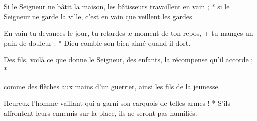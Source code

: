 \item Si le Seigneur ne bâtit la maison, les bâtisseurs travaillent en vain ; * si le Seigneur ne garde la ville, c'est en vain que veillent les gardes.

\item En vain tu devances le jour, tu retardes le moment de ton repos, + tu manges un pain de douleur : * Dieu comble son bien-aimé quand il dort.

\item Des fils, voilà ce que donne le Seigneur, des enfants, la récompense qu'il accorde ; *

\item comme des flèches aux mains d'un guerrier, ainsi les fils de la jeunesse.

\item Heureux l'homme vaillant qui a garni son carquois de telles armes ! * S'ils affrontent leurs ennemis sur la place, ils ne seront pas humiliés.